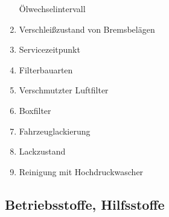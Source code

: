 \begin{enumerate}
  Ölwechselintervall\\
\item
  Verschleißzustand von Bremsbelägen\\
\item
  Servicezeitpunkt\\
\item
  Filterbauarten\\
\item
  Verschmutzter Luftfilter\\
\item
  Boxfilter\\
\item
  Fahrzeuglackierung\\
\item
  Lackzustand\\
\item
  Reinigung mit Hochdruckwascher
\end{enumerate}

\subsection{Betriebsstoffe,
Hilfsstoffe}\label{betriebsstoffe-hilfsstoffe}

